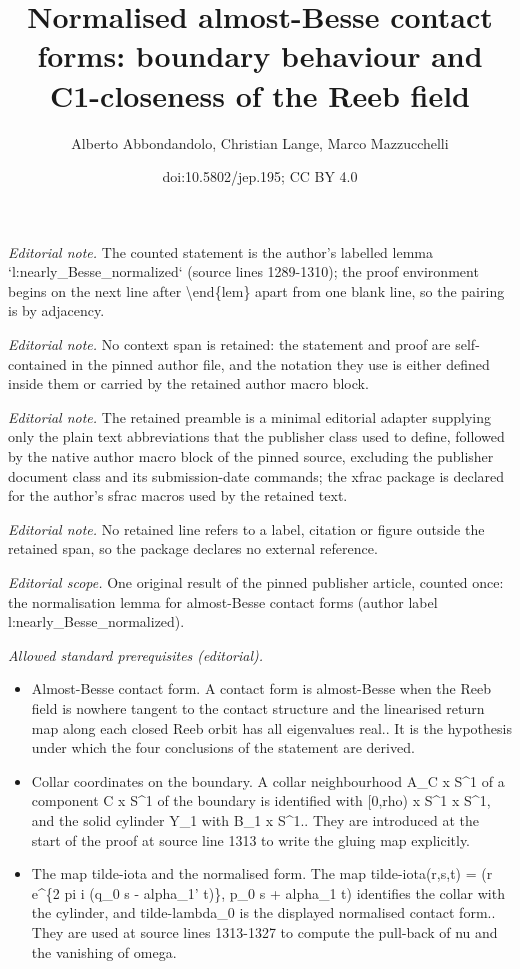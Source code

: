 \documentclass[10pt,a4paper]{article}
\title{Normalised almost-Besse contact forms: boundary behaviour and C1-closeness of the Reeb field}
\author{Alberto Abbondandolo, Christian Lange, Marco Mazzucchelli}
\date{doi:10.5802/jep.195; CC BY 4.0}
\theoremstyle{definition}
\begin{document}
\maketitle
\noindent\textit{Editorial note.} The counted statement is the author's labelled lemma `l:nearly\_Besse\_normalized` (source lines 1289-1310); the proof environment begins on the next line after \textbackslash{}end\{lem\} apart from one blank line, so the pairing is by adjacency.\par\medskip
\noindent\textit{Editorial note.} No context span is retained: the statement and proof are self-contained in the pinned author file, and the notation they use is either defined inside them or carried by the retained author macro block.\par\medskip
\noindent\textit{Editorial note.} The retained preamble is a minimal editorial adapter supplying only the plain text abbreviations that the publisher class used to define, followed by the native author macro block of the pinned source, excluding the publisher document class and its submission-date commands; the xfrac package is declared for the author's sfrac macros used by the retained text.\par\medskip
\noindent\textit{Editorial note.} No retained line refers to a label, citation or figure outside the retained span, so the package declares no external reference.\par\medskip
\noindent\textit{Editorial scope.} One original result of the pinned publisher article, counted once: the normalisation lemma for almost-Besse contact forms (author label l:nearly\_Besse\_normalized).\par\medskip
\noindent\textit{Allowed standard prerequisites (editorial).}\begin{itemize}
\item Almost-Besse contact form. A contact form is almost-Besse when the Reeb field is nowhere tangent to the contact structure and the linearised return map along each closed Reeb orbit has all eigenvalues real.. It is the hypothesis under which the four conclusions of the statement are derived.
\item Collar coordinates on the boundary. A collar neighbourhood A\_C x S\textasciicircum{}1 of a component C x S\textasciicircum{}1 of the boundary is identified with [0,rho) x S\textasciicircum{}1 x S\textasciicircum{}1, and the solid cylinder Y\_1 with B\_1 x S\textasciicircum{}1.. They are introduced at the start of the proof at source line 1313 to write the gluing map explicitly.
\item The map tilde-iota and the normalised form. The map tilde-iota(r,s,t) = (r e\textasciicircum{}\{2 pi i (q\_0 s - alpha\_1' t)\}, p\_0 s + alpha\_1 t) identifies the collar with the cylinder, and tilde-lambda\_0 is the displayed normalised contact form.. They are used at source lines 1313-1327 to compute the pull-back of nu and the vanishing of omega.
\end{itemize}\medskip
\end{document}
